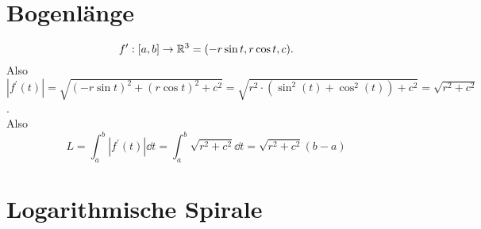 \documentclass[sectionformat=aufgabe]{gadsescript}
\begin{document}
\maketitle
\section{Bogenlänge}
\[
	f^\prime : [a, b] \to \mathbb{R} ^3 = (- r \sin t, r \cos t, c).
\]
Also $ \left| f^\prime (t) \right| = \sqrt{(-r \sin t)^2 + (r \cos t )^2 + c^2} = \sqrt{r^2 \cdot (\sin ^2(t) + \cos ^2 (t)) + c^2} = \sqrt{r^2 + c^2}  $.\\
Also
\[
	L = \int_{a}^{b} \left| f^\prime (t) \right| \dd t = \int_{a}^{b} \sqrt{r^2 + c^2} \dd t = \sqrt{r^2 + c^2} (b - a)
\]

\section{Logarithmische Spirale}
\end{document}

